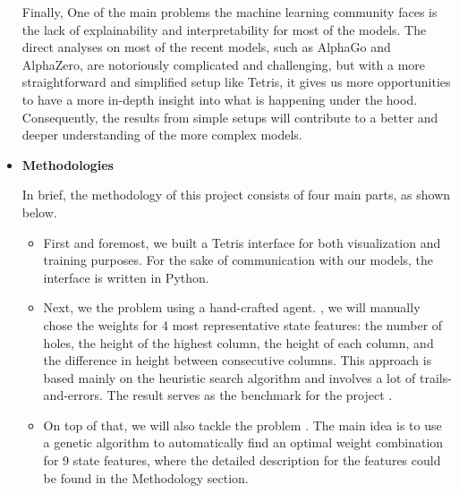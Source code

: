 \documentclass[letterpaper]{article} %
\begin{document}
\begin{itemize}
Finally,  One of the main problems the machine learning community faces is the lack of explainability and interpretability for most of the models. The direct analyses on most of the recent models, such as AlphaGo and AlphaZero, are notoriously complicated and challenging, but with a more straightforward and simplified setup like Tetris, it gives us more opportunities to have a more in-depth insight into what is happening under the hood. Consequently, the results from simple setups will contribute to a better and deeper understanding of the more complex models.

\item 
{\bf Methodologies}

In brief, the methodology of this project consists of four main parts, as shown below.
\begin{itemize}
  \item 
  First and foremost, we built a Tetris interface for both visualization and training purposes. For the sake of communication with our models, the interface is written in Python. 
  \item 
  Next, we  the problem using a hand-crafted agent.  \cite{Bertsekas_1996}, we will manually chose the weights for 4 most representative state features: the number of holes, the height of the highest column, the height of each column, and the difference in height between consecutive columns. This approach is based mainly on the heuristic search algorithm and involves a lot of trails-and-errors. The result serves as the benchmark for the project .
  \item 
  On top of that, we will also tackle the problem . The main idea is to use a genetic algorithm to automatically find an optimal weight combination for 9 state features, where the detailed description for the features could be found in the Methodology section. 
  

\end{itemize}
\end{itemize}
\end{document}
